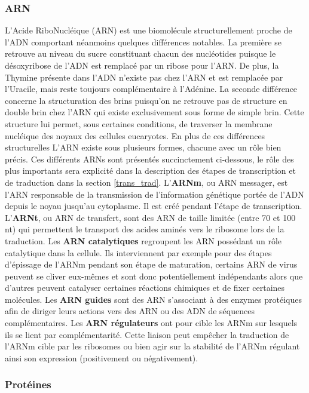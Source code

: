 \subsubsection{ARN}

L'Acide RiboNucléique (ARN) est une biomolécule structurellement proche de l'ADN comportant néanmoins quelques différences notables. La première se retrouve au niveau du sucre constituant chacun des nucléotides puisque le désoxyribose de l'ADN est remplacé par un ribose pour l'ARN. De plus, la Thymine présente dans l'ADN n'existe pas chez l'ARN et est remplacée par l'Uracile, mais reste toujours complémentaire à l'Adénine. La seconde différence concerne la structuration des brins puisqu'on ne retrouve pas de structure en double brin chez l'ARN qui existe exclusivement sous forme de simple brin. Cette structure lui permet, sous certaines conditions, de traverser la membrane nucléique des noyaux des cellules eucaryotes.
En plus de ces différences structurelles L'ARN existe sous plusieurs formes, chacune avec un rôle bien précis. Ces différents ARNs sont présentés succinctement ci-dessous, le rôle des plus importants sera explicité dans la description des étapes de transcription et de traduction dans la section \ref{trans_trad}.
L'\textbf{ARNm}, ou ARN messager, est l'ARN responsable de la transmission de l'information génétique portée de l'ADN depuis le noyau jusqu'au cytoplasme. Il est créé pendant l’étape de transcription.
L'\textbf{ARNt}, ou ARN de transfert, sont des ARN de taille limitée (entre 70 et 100 nt) qui permettent le transport des acides aminés vers le ribosome lors de la traduction.
Les \textbf{ARN catalytiques} regroupent les ARN possédant un rôle catalytique dans la cellule. Ils interviennent par exemple pour des étapes d'épissage de l'ARNm pendant son étape de maturation, certains ARN de virus peuvent se cliver eux-mêmes et sont donc potentiellement indépendants alors que d'autres peuvent catalyser certaines réactions chimiques et de fixer certaines molécules.
Les \textbf{ARN guides} sont des ARN s'associant à des enzymes protéiques afin de diriger leurs actions vers des ARN ou des ADN de séquences complémentaires.
Les \textbf{ARN régulateurs} ont pour cible les ARNm sur lesquels ils se lient par complémentarité. Cette liaison peut empêcher la traduction de l'ARNm cible par les ribosomes ou bien agir sur la stabilité de l'ARNm régulant ainsi son expression (positivement ou négativement).

\subsubsection{Protéines}

